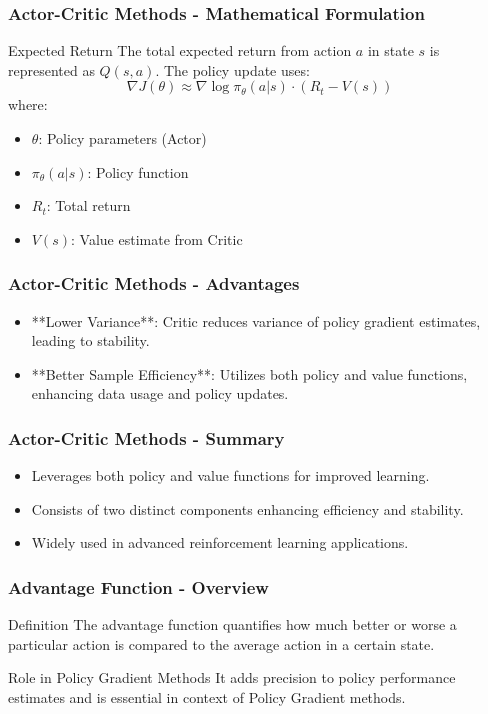 \documentclass[aspectratio=169]{beamer}
\begin{document}
\begin{frame}[fragile]
    \frametitle{Actor-Critic Methods - Mathematical Formulation}
    \begin{block}{Expected Return}
        The total expected return from action \(a\) in state \(s\) is represented as \(Q(s, a)\). The policy update uses:
        \begin{equation}
            \nabla J(\theta) \approx \nabla \log \pi_\theta(a|s) \cdot (R_t - V(s))
        \end{equation}
        where:
        \begin{itemize}
            \item \( \theta \): Policy parameters (Actor)
            \item \( \pi_\theta(a|s) \): Policy function
            \item \( R_t \): Total return
            \item \( V(s) \): Value estimate from Critic
        \end{itemize}
    \end{block}
\end{frame}

\begin{frame}[fragile]
    \frametitle{Actor-Critic Methods - Advantages}
    \begin{itemize}
        \item **Lower Variance**: Critic reduces variance of policy gradient estimates, leading to stability.
        \item **Better Sample Efficiency**: Utilizes both policy and value functions, enhancing data usage and policy updates.
    \end{itemize}
\end{frame}

\begin{frame}[fragile]
    \frametitle{Actor-Critic Methods - Summary}
    \begin{itemize}
        \item Leverages both policy and value functions for improved learning.
        \item Consists of two distinct components enhancing efficiency and stability.
        \item Widely used in advanced reinforcement learning applications.
    \end{itemize}
\end{frame}

\begin{frame}[fragile]
    \frametitle{Advantage Function - Overview}
    \begin{block}{Definition}
        The advantage function quantifies how much better or worse a particular action is compared to the average action in a certain state.
    \end{block}
    \begin{block}{Role in Policy Gradient Methods}
        It adds precision to policy performance estimates and is essential in context of Policy Gradient methods.
    \end{block}
\end{frame}
\end{document}
